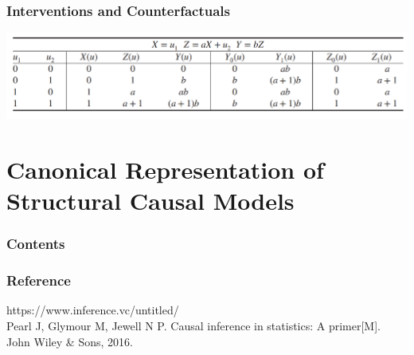 \documentclass{beamer}
\begin{document}
\begin{frame}
    \frametitle{Interventions and Counterfactuals} 
    \includegraphics[scale=0.55]{fig15.png}
     \\
\end{frame}


\section{Canonical Representation of Structural Causal Models}

\begin{frame}
    \frametitle{Contents}
    \tableofcontents[currentsection]
\end{frame}

\begin{frame}
    \frametitle{Reference} 
    https://www.inference.vc/untitled/ \\
    Pearl J, Glymour M, Jewell N P. Causal inference in statistics: A primer[M]. John Wiley \& Sons, 2016. \\

\end{frame}
\end{document}

